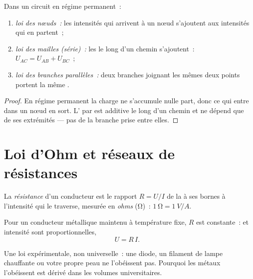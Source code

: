 \begin{proposition}\label{prop:g11:circuits-and-power:laws}
Dans un circuit en régime permanent~:
\begin{enumerate}
  \item \emph{loi des nœuds~:} les intensités qui arrivent à un nœud
        s'ajoutent aux intensités qui en partent~;
  \item \emph{loi des mailles (série)~:} les
         le long d'un chemin
        s'ajoutent~: $U_{AC} = U_{AB} + U_{BC}$~;
  \item \emph{loi des branches parallèles~:} deux branches joignant les
        mêmes deux points portent la même
        .
\end{enumerate}
\end{proposition}

\begin{proof}
En régime permanent la charge ne s'accumule nulle part, donc ce qui
entre dans un nœud en sort.
L' par
 est additive le long d'un chemin et
ne dépend que de ses extrémités --- pas de la branche prise entre
elles.
\end{proof}

\section{Loi d'Ohm et réseaux de résistances}

\begin{definition}[Résistance]\label{def:g11:circuits-and-power:resistance}
La \emph{résistance} d'un conducteur est le rapport
$R = U/I$ de la  à ses bornes à
l'intensité qui le traverse, mesurée en \emph{ohms}
(\unit{\ohm})~: $\qty{1}{\ohm} = \qty{1}{V/A}$.
\end{definition}

\begin{proposition}\label{prop:g11:circuits-and-power:ohm}
Pour un conducteur métallique maintenu à température fixe, $R$ est
constante~:  et intensité sont
proportionnelles,
\[ U = R\,I . \]
\end{proposition}
\admitted

\begin{remark}\label{rem:g11:circuits-and-power:ohm-limits}
Une loi expérimentale, non universelle~: une diode, un filament de
lampe chauffante ou votre propre peau ne l'obéissent pas. Pourquoi les
métaux l'obéissent est dérivé dans les volumes universitaires.
\end{remark}

